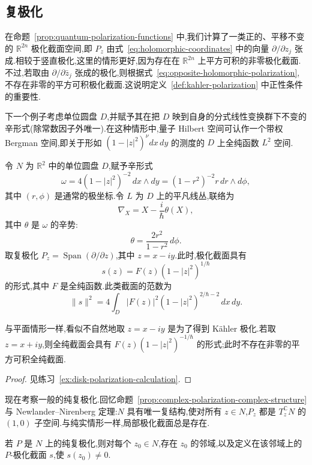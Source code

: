 \subsection{复极化}
\label{subsec:complex-polarizations}

在命题~\ref{prop:quantum-polarization-functions} 中,我们计算了一类正的、平移不变的 $\mathbb R^{2n}$ 极化截面空间,即 $P_z$ 由式~\eqref{eq:holomorphic-coordinates} 中的向量 $\partial/\partial z_j$ 张成.相较于竖直极化,这里的情形更好,因为存在在 $\mathbb R^{2n}$ 上平方可积的非零极化截面.不过,若取由 $\partial/\partial\bar z_j$ 张成的极化,则根据式~\eqref{eq:opposite-holomorphic-polarization},不存在非零的平方可积极化截面.这说明定义~\ref{def:kahler-polarization} 中正性条件的重要性.

下一个例子考虑单位圆盘 $D$,并赋予其在把 $D$ 映到自身的分式线性变换群下不变的辛形式(除常数因子外唯一).在这种情形中,量子 Hilbert 空间可认作一个带权 Bergman 空间,即关于形如 $(1-|z|^2)^\nu dx\,dy$ 的测度的 $D$ 上全纯函数 $L^2$ 空间.

\begin{example}[单位圆盘上的复极化]
\label{ex:disk-polarization}
令 $N$ 为 $\mathbb R^2$ 中的单位圆盘 $D$,赋予辛形式
\[
 \omega=4(1-|z|^2)^{-2}\,dx\wedge dy
 =(1-r^2)^{-2}r\,dr\wedge d\phi,
\]
其中 $(r,\phi)$ 是通常的极坐标.令 $L$ 为 $D$ 上的平凡线丛,联络为
\[
 \nabla_X=X-\frac{i}{\hbar}\theta(X),
\]
其中 $\theta$ 是 $\omega$ 的辛势:
\[
 \theta=\frac{2r^2}{1-r^2}\,d\phi.
\]
取复极化 $P_z=\operatorname{Span}(\partial/\partial z)$,其中 $z=x-iy$.此时,极化截面具有
\[
 s(z)=F(z)(1-|z|^2)^{1/\hbar}
\]
的形式,其中 $F$ 是全纯函数.此类截面的范数为
\[
 \|s\|^2=4\int_D|F(z)|^2(1-|z|^2)^{2/\hbar-2}\,dx\,dy.
\]
\end{example}

与平面情形一样,看似不自然地取 $z=x-iy$ 是为了得到 Kähler 极化.若取 $z=x+iy$,则全纯截面会具有 $F(z)(1-|z|^2)^{-1/\hbar}$ 的形式;此时不存在非零的平方可积全纯截面.

\begin{proof}
见练习~\ref{ex:disk-polarization-calculation}.
\end{proof}

现在考察一般的纯复极化.回忆命题~\ref{prop:complex-polarization-complex-structure} 与 Newlander--Nirenberg 定理:$N$ 具有唯一复结构,使对所有 $z\in N$,$P_z$ 都是 $T_z^{\mathbb C} N$ 的 $(1,0)$ 子空间.与纯实情形一样,局部极化截面总是存在.

\begin{theorem}[复极化截面的局部存在性]
\label{thm:local-complex-polarized-section}
若 $P$ 是 $N$ 上的纯复极化,则对每个 $z_0\in N$,存在 $z_0$ 的邻域,以及定义在该邻域上的 $P$-极化截面 $s$,使 $s(z_0)\ne0$.
\end{theorem}

